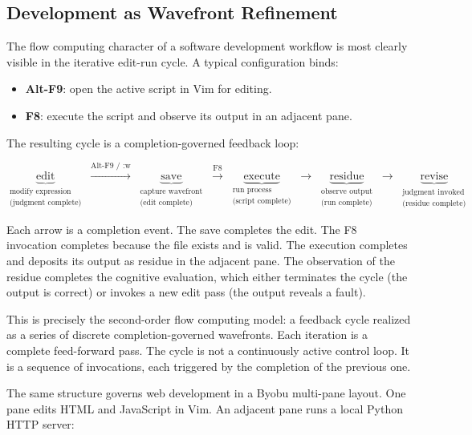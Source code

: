 \documentclass[12pt, a4paper]{article}
\begin{document}
\subsection{Development as Wavefront Refinement}

The flow computing character of a software development workflow
is most clearly visible in the iterative edit-run cycle. A
typical configuration binds:

\begin{itemize}
\item \textbf{Alt-F9}: open the active script in Vim for
  editing.
\item \textbf{F8}: execute the script and observe its output
  in an adjacent pane.
\end{itemize}

The resulting cycle is a completion-governed feedback loop:

\[
\underbrace{\text{edit}}_{\substack{\text{modify expression}\\\text{(judgment complete)}}}
\;\xrightarrow{\text{Alt-F9 / :w}}\;
\underbrace{\text{save}}_{\substack{\text{capture wavefront}\\\text{(edit complete)}}}
\;\xrightarrow{\text{F8}}\;
\underbrace{\text{execute}}_{\substack{\text{run process}\\\text{(script complete)}}}
\;\xrightarrow{}\;
\underbrace{\text{residue}}_{\substack{\text{observe output}\\\text{(run complete)}}}
\;\xrightarrow{}\;
\underbrace{\text{revise}}_{\substack{\text{judgment invoked}\\\text{(residue complete)}}}
\]

Each arrow is a completion event. The save completes the edit.
The F8 invocation completes because the file exists and is
valid. The execution completes and deposits its output as
residue in the adjacent pane. The observation of the residue
completes the cognitive evaluation, which either terminates
the cycle (the output is correct) or invokes a new edit
pass (the output reveals a fault).

This is precisely the second-order flow computing model:
a feedback cycle realized as a series of discrete
completion-governed wavefronts. Each iteration is a complete
feed-forward pass. The cycle is not a continuously active
control loop. It is a sequence of invocations, each triggered
by the completion of the previous one.

The same structure governs web development in a Byobu
multi-pane layout. One pane edits HTML and JavaScript in Vim.
An adjacent pane runs a local Python HTTP server:
\end{document}
